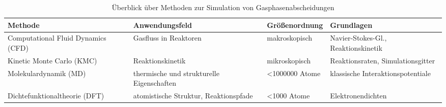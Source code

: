 \begin{table}[H]
  \oddrowcolors
  \caption{Überblick über Methoden zur Simulation von Gasphasenabscheidungen}
  \label{tab:deposition-simulations}
  \begin{tabularx}{\textwidth}{|XXlX|}
    \hline
    \textbf{Methode}                   & \textbf{Anwendungsfeld}                   & \textbf{Größenordnung} & \textbf{Grundlagen}                 \\
    \hline
    Computational Fluid Dynamics (CFD) & Gasfluss in Reaktoren                     & makroskopisch          & Navier-Stokes-Gl., Reaktionskinetik \\
    Kinetic Monte Carlo (KMC)          & Reaktionskinetik                          & mikroskopisch          & Reaktionsraten, Simulationsgitter   \\
    Molekular\-dynamik (MD)            & thermische und strukturelle Eigenschaften & \num{<1000000} Atome   & klassische Interaktionspotentiale   \\
    Dichte\-funktional\-theorie (DFT)  & atomistische Struktur, Reaktionspfade     & \num{<1000} Atome      & Elektronendichten                   \\
    \hline
  \end{tabularx}
\end{table}
